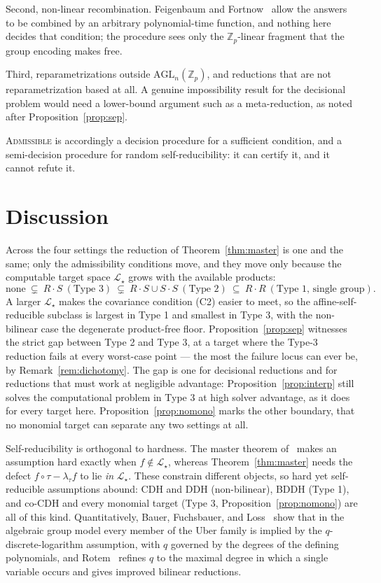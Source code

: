 \documentclass{aicr-solution}
\newcommand{\Zp}{\mathbb{Z}_p}
\newcommand{\LL}{\mathcal{L}}
\newcommand{\AGL}{\mathrm{AGL}}
\begin{document}
Second, non-linear recombination. Feigenbaum and Fortnow~\cite{FF93} allow the answers to be
combined by an arbitrary polynomial-time function, and nothing here decides that condition; the
procedure sees only the $\Zp$-linear fragment that the group encoding makes free.

Third, reparametrizations outside $\AGL_n(\Zp)$, and reductions that are not reparametrization
based at all. A genuine impossibility result for the decisional problem would need a lower-bound
argument such as a meta-reduction, as noted after Proposition~\ref{prop:sep}.

\textsc{Admissible} is accordingly a decision procedure for a sufficient condition, and a
semi-decision procedure for random self-reducibility: it can certify it, and it cannot refute
it.

\section{Discussion}
\label{sec:discussion}

Across the four settings the reduction of Theorem~\ref{thm:master} is one and the same;
only the admissibility conditions move, and they move only because the computable target
space $\LL_\star$ grows with the available products:
\[
  \text{none}\ \subsetneq\ R\cdot S\ (\text{Type 3})\ \subsetneq\ R\cdot S\cup S\cdot S\
  (\text{Type 2})\ \subseteq\ R\cdot R\ (\text{Type 1, single group}).
\]
A larger $\LL_\star$ makes the covariance condition (C2) easier to meet, so the
affine-self-reducible subclass is largest in Type 1 and smallest in Type 3, with the
non-bilinear case the degenerate product-free floor. Proposition~\ref{prop:sep} witnesses the
strict gap between Type 2 and Type 3, at a target where the Type-3 reduction fails at every
worst-case point --- the most the failure locus can ever be, by
Remark~\ref{rem:dichotomy}. The gap is one for decisional reductions and for reductions that
must work at negligible advantage: Proposition~\ref{prop:interp} still solves the
computational problem in Type 3 at high solver advantage, as it does for every target here.
Proposition~\ref{prop:nomono} marks the other boundary, that no monomial target can separate
any two settings at all.

Self-reducibility is orthogonal to hardness. The master theorem
of~\cite{BBG05,Boyen08} makes an assumption hard exactly when $f\notin\LL_\star$, whereas
Theorem~\ref{thm:master} needs the defect $f\circ\tau-\lambda_\tau f$ to lie \emph{in}
$\LL_\star$. These constrain different objects, so hard yet self-reducible assumptions
abound: CDH and DDH (non-bilinear), BDDH (Type 1), and co-CDH and every monomial target
(Type 3, Proposition~\ref{prop:nomono}) are all of this kind. Quantitatively, Bauer, Fuchsbauer, and
Loss~\cite{BFL20} show that in the algebraic group model every member of the Uber family is
implied by the $q$-discrete-logarithm assumption, with $q$ governed by the degrees of the
defining polynomials, and Rotem~\cite{Rotem22} refines $q$ to the maximal degree in which a
single variable occurs and gives improved bilinear reductions.
\end{document}
